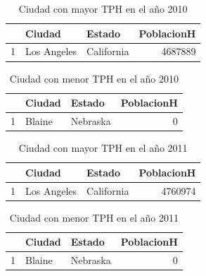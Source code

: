 \documentclass[conference]{IEEEtran}\usepackage[]{graphicx}\usepackage[]{color}
\begin{document}
\begin{table}[ht]
\centering
\begin{tabular}{rllr}
  \hline
 & Ciudad & Estado & PoblacionH \\ 
  \hline
1 & Los Angeles & California & 4687889 \\ 
   \hline
\end{tabular}
\caption{Ciudad con mayor TPH en el año 2010} 
\end{table}


\begin{table}[ht]
\centering
\begin{tabular}{rllr}
  \hline
 & Ciudad & Estado & PoblacionH \\ 
  \hline
1 & Blaine & Nebraska &   0 \\ 
   \hline
\end{tabular}
\caption{Ciudad con menor TPH en el año 2010} 
\end{table}


\begin{table}[ht]
\centering
\begin{tabular}{rllr}
  \hline
 & Ciudad & Estado & PoblacionH \\ 
  \hline
1 & Los Angeles & California & 4760974 \\ 
   \hline
\end{tabular}
\caption{Ciudad con mayor TPH en el año 2011} 
\end{table}


\begin{table}[ht]
\centering
\begin{tabular}{rllr}
  \hline
 & Ciudad & Estado & PoblacionH \\ 
  \hline
1 & Blaine & Nebraska &   0 \\ 
   \hline
\end{tabular}
\caption{Ciudad con menor TPH en el año 2011} 
\end{table}
\end{document}
